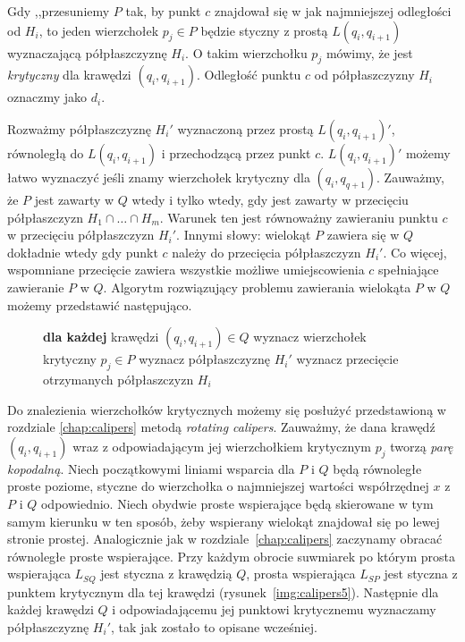 Gdy ,,przesuniemy $P$ tak, by punkt $c$ znajdował się w jak
najmniejszej odległości od $H_i$, to jeden wierzchołek $p_j \in P$
będzie styczny z prostą $L(q_i, q_{i+1})$ wyznaczającą półpłaszczyznę
$H_i$. O takim wierzchołku $p_j$ mówimy, że jest \emph{krytyczny} dla
krawędzi $(q_i, q_{i+1})$. Odległość punktu $c$ od półpłaszczyzny
$H_i$ oznaczmy jako $d_i$.

Rozważmy półpłaszczyznę $H_i'$ wyznaczoną przez prostą
$L(q_i,q_{i+1})'$, równoległą do $L(q_i, q_{i+1})$ i przechodzącą
przez punkt $c$.  $L(q_i,q_{i+1})'$ możemy łatwo wyznaczyć jeśli znamy
wierzchołek krytyczny dla $(q_i, q_{q+1})$. Zauważmy, że $P$ jest
zawarty w $Q$ wtedy i tylko wtedy, gdy jest zawarty w przecięciu
półpłaszczyzn $H_1 \cap \ldots \cap H_m$. Warunek ten jest równoważny
zawieraniu punktu $c$ w przecięciu półpłaszczyzn $H_i'$. Innymi słowy:
wielokąt $P$ zawiera się w $Q$ dokładnie wtedy gdy punkt $c$ należy do
przecięcia półpłaszczyzn $H_i'$. Co więcej, wspomniane przecięcie
zawiera wszystkie możliwe umiejscowienia $c$ spełniające zawieranie
$P$ w $Q$. Algorytm rozwiązujący problemu zawierania wielokąta $P$ w
$Q$ możemy przedstawić następująco.

\begin{figure}[htp]
\begin{algorithmic}[1]

\State \textbf{dla każdej} krawędzi $(q_i, q_{i+1}) \in Q$
\State \hspace{\algorithmicindent} wyznacz wierzchołek krytyczny $p_j \in P$
\State \hspace{\algorithmicindent} wyznacz półpłaszczyznę $H_i'$
\State
\State wyznacz przecięcie otrzymanych półpłaszczyzn $H_i$

\EndProcedure
\end{algorithmic}
\end{figure}

Do znalezienia wierzchołków krytycznych możemy się posłużyć
przedstawioną w rozdziale \ref{chap:calipers} metodą \emph{rotating
  calipers}. Zauważmy, że dana krawędź $(q_i, q_{i+1})$ wraz z
odpowiadającym jej wierzchołkiem krytycznym $p_j$ tworzą \emph{parę
  kopodalną}. Niech początkowymi liniami wsparcia dla $P$ i $Q$ będą
równoległe proste poziome, styczne do wierzchołka o najmniejszej
wartości współrzędnej $x$ z $P$ i $Q$ odpowiednio. Niech obydwie
proste wspierające będą skierowane w tym samym kierunku w ten sposób,
żeby wspierany wielokąt znajdował się po lewej stronie
prostej. Analogicznie jak w rozdziale~\ref{chap:calipers} zaczynamy
obracać równoległe proste wspierające. Przy każdym obrocie suwmiarek
po którym prosta wspierająca $L_{SQ}$ jest styczna z krawędzią $Q$,
prosta wspierająca $L_{SP}$ jest styczna z punktem krytycznym dla tej
krawędzi (rysunek~\ref{img:calipers5}). Następnie dla każdej krawędzi
$Q$ i odpowiadającemu jej punktowi krytycznemu wyznaczamy
półpłaszczyznę $H_i'$, tak jak zostało to opisane wcześniej.

